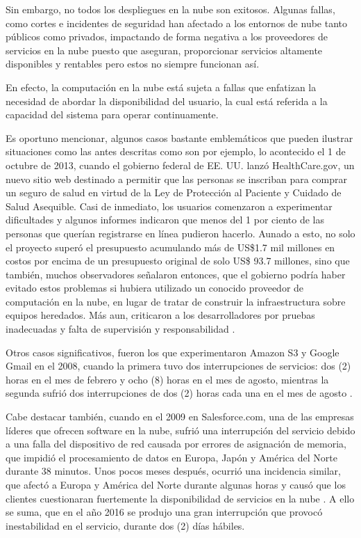 \par Sin embargo, no todos los despliegues en la nube son exitosos.  Algunas  fallas, como cortes e incidentes de seguridad han afectado a los entornos de nube tanto públicos como privados, impactando de forma negativa a los proveedores de servicios en la nube puesto que aseguran, proporcionar servicios altamente disponibles y rentables pero estos no siempre funcionan así.\\
\par En efecto, la computación en la nube está sujeta a fallas que enfatizan la necesidad de abordar la disponibilidad del usuario, la cual está referida a la capacidad del sistema para operar continuamente.\\

\par  Es oportuno mencionar, algunos casos bastante emblemáticos que pueden ilustrar situaciones como las antes descritas como son por ejemplo, lo acontecido el 1 de octubre de 2013, cuando el gobierno federal de EE. UU. lanzó HealthCare.gov, un nuevo sitio web destinado a permitir que las personas se inscriban para comprar un seguro de salud en virtud de la Ley de Protección al Paciente y Cuidado de Salud Asequible\cite{PLAN09}. Casi de inmediato, los usuarios comenzaron a experimentar dificultades y algunos informes indicaron que menos del 1 por ciento de las personas que querían registrarse en línea pudieron hacerlo. Aunado a esto, no solo el proyecto superó el presupuesto acumulando más de US\$1.7 mil millones en costos por encima de un presupuesto original de solo US\$ 93.7 millones, sino que también, muchos observadores señalaron entonces, que el gobierno podría haber evitado estos problemas si hubiera utilizado un conocido proveedor de computación en la nube, en lugar de tratar de construir la infraestructura sobre equipos heredados. Más aun, criticaron a los desarrolladores por pruebas inadecuadas y falta de supervisión y responsabilidad \cite{PLAN09}.\\

\par Otros casos significativos, fueron  los  que experimentaron Amazon S3 y Google Gmail en el 2008, cuando la primera tuvo dos interrupciones de servicios: dos (2) horas en el mes de febrero y ocho (8) horas en el mes de agosto, mientras la segunda sufrió dos interrupciones de dos (2) horas cada una  en el mes de agosto \cite{PLAN11}.\\

\par Cabe destacar también, cuando en el 2009 en Salesforce.com, una de las empresas líderes que ofrecen software en la nube, sufrió una interrupción del servicio debido a una falla del dispositivo de red causada por errores de asignación de memoria, que impidió el procesamiento de datos en Europa, Japón y América del Norte durante 38 minutos. Unos pocos meses después, ocurrió una incidencia similar, que afectó a Europa y América del Norte durante algunas horas y causó que los clientes cuestionaran fuertemente la disponibilidad de servicios en la nube \cite{PLAN08,PLAN10}. A ello se suma, que en el año 2016 se produjo una gran interrupción que provocó inestabilidad en el servicio, durante dos (2) días hábiles.\\

